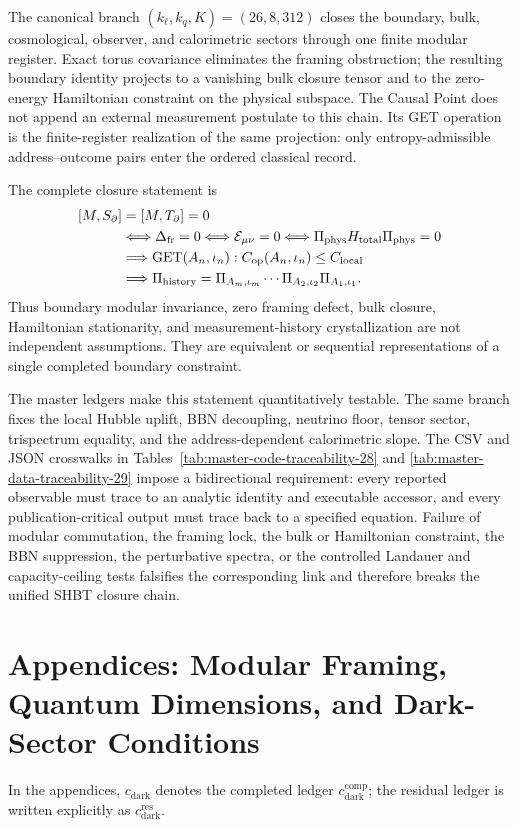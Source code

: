 \documentclass[11pt,letterpaper]{article}
\theoremstyle{plain}
\newcommand{\cdarkres}{c_{\text{dark}}^{\text{res}}}
\newcommand{\cdarkcomp}{c_{\text{dark}}^{\text{comp}}}
\begin{document}
The canonical branch \((k_\ell,k_q,K)=(26,8,312)\) closes the boundary,
bulk, cosmological, observer, and calorimetric sectors through one finite
modular register.  Exact torus covariance eliminates the framing obstruction;
the resulting boundary identity projects to a vanishing bulk closure tensor
and to the zero-energy Hamiltonian constraint on the physical subspace.  The
Causal Point does not append an external measurement postulate to this chain.
Its GET operation is the finite-register realization of the same projection:
only entropy-admissible address--outcome pairs enter the ordered classical
record.

The complete closure statement is
\begin{align}
\label{eq:final-document-closure-chain}
 [M,S_{\partial}]
 &=[M,T_{\partial}]=0
 \notag\\
 &\Longleftrightarrow
 \Delta_{\mathrm{fr}}=0
 \Longleftrightarrow
 \mathcal E_{\mu\nu}=0
 \Longleftrightarrow
 \Pi_{\mathrm{phys}}H_{\mathrm{total}}\Pi_{\mathrm{phys}}=0
 \notag\\
 &\Longrightarrow
 \operatorname{GET}(A_n,\iota_n):
 C_{\mathrm{op}}(A_n,\iota_n)
 \le C_{\mathrm{local}}
 \notag\\
 &\Longrightarrow
 \Pi_{\mathrm{history}}
 =
 \Pi_{A_m,\iota_m}\cdots
 \Pi_{A_2,\iota_2}\Pi_{A_1,\iota_1}.
\end{align}
Thus boundary modular invariance, zero framing defect, bulk closure,
Hamiltonian stationarity, and measurement-history crystallization are not
independent assumptions.  They are equivalent or sequential representations
of a single completed boundary constraint.

The master ledgers make this statement quantitatively testable.  The same
branch fixes the local Hubble uplift, BBN decoupling, neutrino floor, tensor
sector, trispectrum equality, and the address-dependent calorimetric slope.
The CSV and JSON crosswalks in
Tables~\ref{tab:master-code-traceability-28} and
\ref{tab:master-data-traceability-29} impose a bidirectional requirement:
every reported observable must trace to an analytic identity and executable
accessor, and every publication-critical output must trace back to a specified
equation.  Failure of modular commutation, the framing lock, the bulk or
Hamiltonian constraint, the BBN suppression, the perturbative spectra, or the
controlled Landauer and capacity-ceiling tests falsifies the corresponding
link and therefore breaks the unified SHBT closure chain.

\appendix
\section*{Appendices: Modular Framing, Quantum Dimensions, and Dark-Sector Conditions}
In the appendices, \(c_{\text{dark}}\) denotes the completed ledger
\(\cdarkcomp\); the residual ledger is written explicitly as \(\cdarkres\).
\end{document}
